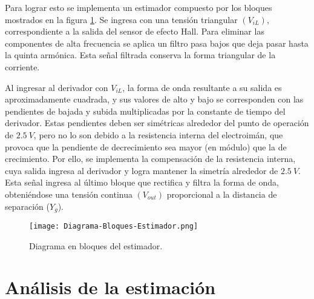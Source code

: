 

\noindent Para lograr esto se implementa un estimador compuesto por los bloques mostrados en la figura \ref{fig:img_Diagrama-Bloques-Estimador.png}. Se ingresa con una tensión triangular $(V_{iL})$, correspondiente a la salida del sensor de efecto Hall. Para eliminar las componentes de alta frecuencia se aplica un filtro pasa bajos que deja pasar hasta la quinta armónica. Esta señal filtrada conserva la forma triangular de la corriente. 

\noindent Al ingresar al derivador con $V_{iL}$, la forma de onda resultante a su salida es aproximadamente cuadrada, y sus valores de alto y bajo se corresponden con las pendientes de bajada y subida multiplicadas por la constante de tiempo del derivador. Estas pendientes deben ser simétricas alrededor del punto de operación de $2.5\:V$, pero no lo son debido a la resistencia interna del electroimán, que provoca que la pendiente de decrecimiento sea mayor (en módulo) que la de crecimiento. Por ello, se implementa la compensación de la resistencia interna, cuya salida ingresa al derivador y logra mantener la simetría alrededor de $2.5\:V$. Esta señal ingresa al último bloque que rectifica y filtra la forma de onda, obteniéndose una tensión continua $(V_{out})$ proporcional a la distancia de separación ($Y_{g}$).

\begin{figure}[H]
	\centering
	\texttt{[image: Diagrama-Bloques-Estimador.png]}
	\caption{Diagrama en bloques del estimador.}
	\label{fig:img_Diagrama-Bloques-Estimador.png}
\end{figure}

\section{An\'{a}lisis de la estimaci\'{o}n}

